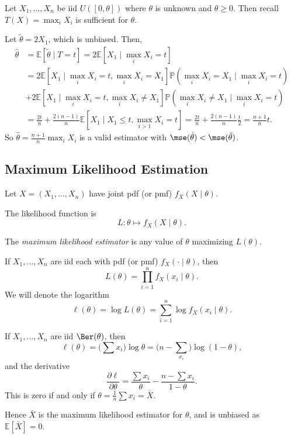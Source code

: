 \documentclass[12pt]{article}
\begin{document}
\begin{exbox}
	Let $X_1, \ldots, X_n$ be iid $U([0, \theta])$ where $\theta$ is unknown and $\theta \geq 0$. Then recall $T(X) = \max_{i} X_i$ is sufficient for $\theta$.

	Let $\tilde \theta = 2 X_1$, which is unbiased. Then,
	\begin{align*}
		\hat \theta &= \mathbb{E}[\tilde \theta \mid T = t] = 2 \mathbb{E}[X_1 \mid \max_{i} X_i = t] \\
			    &= 2 \mathbb{E}[X_1 \mid \max_{i} X_i = t, \max_{i} X_i = X_1] \mathbb{P}(\max_{i} X_i = X_1 \mid \max_{i} X_i = t) \\
			    &+ 2 \mathbb{E}[X_1 \mid \max_{i}X_i = t, \max_{i} X_i \neq X_1] \mathbb{P}(\max_{i}X_i \neq X_1 \mid \max_{i}X_i = t) \\
			    &= \frac{2t}{n} + \frac{2(n-1)}{n} \mathbb{E}[X_1 \mid X_1 \leq t, \max_{i>1} X_i = t] = \frac{2t}{n} + \frac{2(n-1)}{n} \frac{t}{2} = \frac{n+1}{n} t.
	\end{align*}
	So $\hat \theta = \frac{n+1}{n} \max_{i} X_i$ is a valid estimator with $\mse(\hat \theta) < \mse(\tilde \theta)$.
\end{exbox}

\subsection{Maximum Likelihood Estimation}
\label{sub:maximum_likelihood_estimation}

Let $X = (X_1, \ldots, X_n)$ have joint pdf (or pmf) $f_X(X \mid \theta)$.

\begin{definition}
	The likelihood function is
	\[
	L : \theta \mapsto f_X(X \mid \theta)
	.\]
\end{definition}

The \emph{maximum likelihood estimator} is any value of $\theta$ maximizing $L(\theta)$.

If $X_1, \ldots, X_n$ are iid each with pdf (or pmf) $f_X(\cdot \mid \theta)$, then
\[
L(\theta) = \prod_{i=1}^{n} f_X(x_i \mid \theta)
.\]
We will denote the logarithm
\[
\ell(\theta) = \log L (\theta) = \sum_{i = 1}^{n} \log f_X(x_i \mid \theta)
.\]

\begin{exbox}
	If $X_1, \ldots, X_n$ are iid $\Ber(\theta)$, then
	\[
	\ell(\theta) = \Biggl(\sum x_i\Biggr) \log \theta = \Biggl(n - \sum_{x_i} \Biggr) \log(1 - \theta)
	,\]
	and the derivative
	\[
	\frac{\partial \ell}{\partial \theta} = \frac{\sum x_i}{\theta} - \frac{n - \sum x_i}{1 - \theta}
	.\]
	This is zero if and only if $\theta = \frac{1}{n} \sum x_i = \bar X$.

	Hence $\bar X$ is the maximum likelihood estimator for $\theta$, and is unbiased as $\mathbb{E}[\bar X] = 0$.
\end{exbox}
\end{document}

